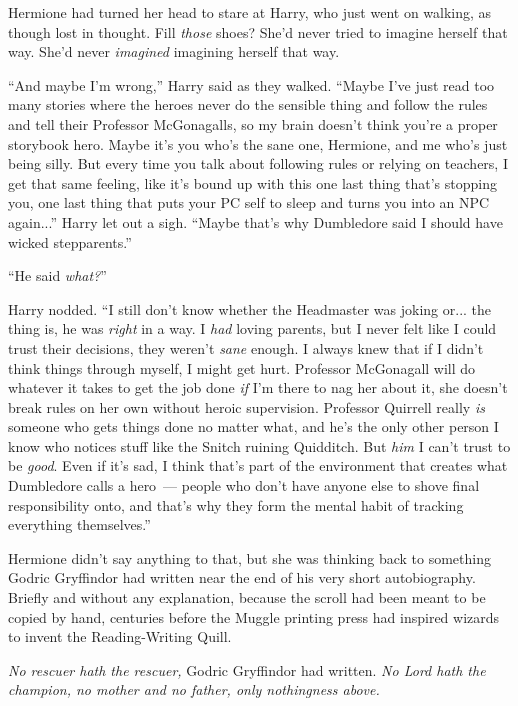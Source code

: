 Hermione had turned her head to stare at Harry, who just went on walking, as though lost in thought. Fill \emph{those} shoes? She'd never tried to imagine herself that way. She'd never \emph{imagined} imagining herself that way.

``And maybe I'm wrong,'' Harry said as they walked. ``Maybe I've just read too many stories where the heroes never do the sensible thing and follow the rules and tell their Professor McGonagalls, so my brain doesn't think you're a proper storybook hero. Maybe it's you who's the sane one, Hermione, and me who's just being silly. But every time you talk about following rules or relying on teachers, I get that same feeling, like it's bound up with this one last thing that's stopping you, one last thing that puts your PC self to sleep and turns you into an NPC again...'' Harry let out a sigh. ``Maybe that's why Dumbledore said I should have wicked stepparents.''

``He said \emph{what?}''

Harry nodded. ``I still don't know whether the Headmaster was joking or... the thing is, he was \emph{right} in a way. I \emph{had} loving parents, but I never felt like I could trust their decisions, they weren't \emph{sane} enough. I always knew that if I didn't think things through myself, I might get hurt. Professor McGonagall will do whatever it takes to get the job done \emph{if} I'm there to nag her about it, she doesn't break rules on her own without heroic supervision. Professor Quirrell really \emph{is} someone who gets things done no matter what, and he's the only other person I know who notices stuff like the Snitch ruining Quidditch. But \emph{him} I can't trust to be \emph{good}. Even if it's sad, I think that's part of the environment that creates what Dumbledore calls a hero~--- people who don't have anyone else to shove final responsibility onto, and that's why they form the mental habit of tracking everything themselves.''

Hermione didn't say anything to that, but she was thinking back to something Godric Gryffindor had written near the end of his very short autobiography. Briefly and without any explanation, because the scroll had been meant to be copied by hand, centuries before the Muggle printing press had inspired wizards to invent the Reading-Writing Quill.

\emph{No rescuer hath the rescuer,} Godric Gryffindor had written. \emph{No Lord hath the champion, no mother and no father, only nothingness above.}

